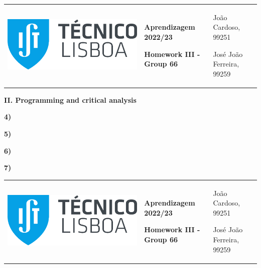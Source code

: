 \documentclass[11pt,a4paper]{article}
\begin{document}
\pagebreak
\color{darkgray}
\hspace{-8.25mm}
\begin{tabularx}{1.09\textwidth} {>{\raggedright\arraybackslash}X >{\centering\arraybackslash}X >{\raggedleft\arraybackslash}X}
  \includegraphics[scale=0.2]{tecnico.pdf} &
  \textbf{Aprendizagem 2022/23} \par \textbf{Homework III - Group 66} &
  João Cardoso, 99251 \par José João Ferreira, 99259
\end{tabularx}
\color{black}

\begin{center}
\textbf{II. Programming and critical analysis}
\end{center}

\begin{flushleft}
\textbf{4)} \par
\begin{center}
\end{center}
\end{flushleft}

\begin{flushleft}
\textbf{5)}
\end{flushleft}

\begin{flushleft}
\textbf{6)}
\end{flushleft}

\begin{flushleft}
\textbf{7)}
\end{flushleft}

\pagebreak
\color{darkgray}
\hspace{-8.25mm}
\begin{tabularx}{1.09\textwidth} {>{\raggedright\arraybackslash}X >{\centering\arraybackslash}X >{\raggedleft\arraybackslash}X}
  \includegraphics[scale=0.2]{tecnico.pdf} &
  \textbf{Aprendizagem 2022/23} \par \textbf{Homework III - Group 66} &
  João Cardoso, 99251 \par José João Ferreira, 99259
\end{tabularx}
\color{black}
\end{document}
